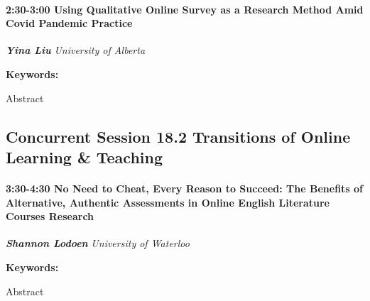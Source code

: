 \documentclass[
]{book}
\begin{document}
\begin{session}
\hypertarget{using-qualitative-online-survey-as-a-research-method-amid-covid-pandemic-practice}{%
\paragraph*{\texorpdfstring{2:30-3:00 \textbar{} \textbf{Using
Qualitative Online Survey as a Research Method Amid Covid Pandemic}
\textbar{}
Practice}{2:30-3:00 \textbar{} Using Qualitative Online Survey as a Research Method Amid Covid Pandemic \textbar{} Practice}}\label{using-qualitative-online-survey-as-a-research-method-amid-covid-pandemic-practice}}

\textbf{\emph{Yina Liu}} \textbar{} \emph{University of Alberta}

\textbf{Keywords:}

Abstract
\end{session}

\hypertarget{concurrent-session-18.2-transitions-of-online-learning-teaching}{%
\subsection*{Concurrent Session 18.2 \textbar{} Transitions of Online Learning \& Teaching}\label{concurrent-session-18.2-transitions-of-online-learning-teaching}}

\begin{session}
\hypertarget{no-need-to-cheat-every-reason-to-succeed-the-benefits-of-alternative-authentic-assessments-in-online-english-literature-courses-research}{%
\paragraph*{\texorpdfstring{3:30-4:30 \textbar{} \textbf{No Need to
Cheat, Every Reason to Succeed: The Benefits of Alternative, Authentic
Assessments in Online English Literature Courses} \textbar{}
Research}{3:30-4:30 \textbar{} No Need to Cheat, Every Reason to Succeed: The Benefits of Alternative, Authentic Assessments in Online English Literature Courses \textbar{} Research}}\label{no-need-to-cheat-every-reason-to-succeed-the-benefits-of-alternative-authentic-assessments-in-online-english-literature-courses-research}}

\textbf{\emph{Shannon Lodoen}} \textbar{} \emph{University of Waterloo}

\textbf{Keywords:}

Abstract
\end{session}
\end{document}
